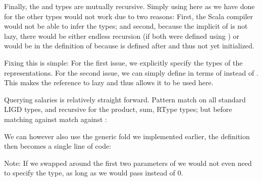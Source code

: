 Finally, the  and  types are mutually recursive. Simply
using  here as we have done for the other types would not work due
to two reasons: First, the Scala compiler would not be able to infer the types;
and second, because the implicit  of  is not lazy, there would
be either endless recursion (if both were defined using ) or 
would be  in the definition of  because  is defined
after  and thus not yet initialized.

Fixing this is simple: For the first issue, we explicitly specify the types of
the representations. For the second issue, we can simply define  in
terms of  instead of . This makes the reference to 
lazy and thus allows it to be used here.



\begin{example}

Querying salaries is relatively straight forward. Pattern match on all standard
LIGD types, and recursive for the product, sum, RType types; but before matching
against  match against :



We can however also use the generic fold we implemented earlier, the definition
then becomes a single line of code:



Note: If we swapped around the first two parameters of  we would not even
need to specify the  type, as long as we would pass  instead
of 0.

\end{example}

